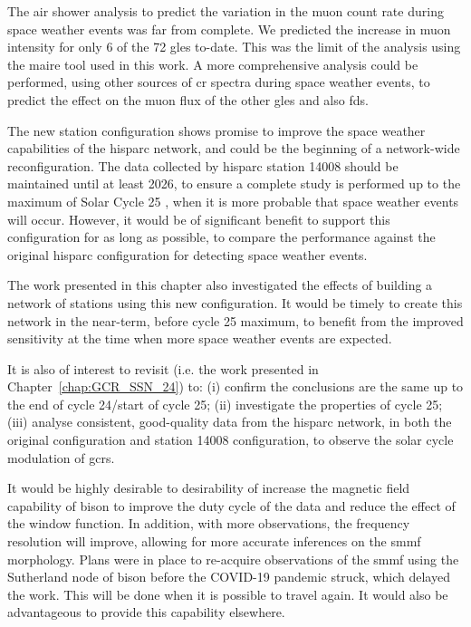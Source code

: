 The air shower analysis to predict the variation in the muon count rate during space weather events was far from complete. We predicted the increase in muon intensity for only 6 of the 72 \glspl{gle} to-date. This was the limit of the analysis using the \gls{maire} tool used in this work. A more comprehensive analysis could be performed, using other sources of \gls{cr} spectra during space weather events, to predict the effect on the muon flux of the other \glspl{gle} and also \glspl{fd}.

The new station configuration shows promise to improve the space weather capabilities of the \gls{hisparc} network, and could be the beginning of a network-wide reconfiguration. The data collected by \gls{hisparc} station 14008 should be maintained until at least 2026, to ensure a complete study is performed up to the maximum of Solar Cycle 25 \citep{mcintosh_overlapping_2020, pesnell_lessons_2020}, when it is more probable that space weather events will occur. However, it would be of significant benefit to support this configuration for as long as possible, to compare the performance against the original \gls{hisparc} configuration for detecting space weather events.

The work presented in this chapter also investigated the effects of building a network of stations using this new configuration. It would be timely to create this network in the near-term, before cycle 25 maximum, to benefit from the improved sensitivity at the time when more space weather events are expected.


\vspace{2em}


It is also of interest to revisit \citet{ross_behaviour_2019} (i.e. the work presented in Chapter~\ref{chap:GCR_SSN_24}) to: (i) confirm the conclusions are the same up to the end of cycle 24/start of cycle 25; (ii) investigate the properties of cycle 25; (iii) analyse consistent, good-quality data from the \gls{hisparc} network, in both the original configuration and station 14008 configuration, to observe the solar cycle modulation of \glspl{gcr}.


\vspace{2em}


It would be highly desirable to desirability of increase the magnetic field capability of \gls{bison} to improve the duty cycle of the data and reduce the effect of the window function. In addition, with more observations, the frequency resolution will improve, allowing for more accurate inferences on the \gls{smmf} morphology. Plans were in place to re-acquire observations of the \gls{smmf} using the Sutherland node of \gls{bison} before the COVID-19 pandemic struck, which delayed the work. This will be done when it is possible to travel again. It would also be advantageous to provide this capability elsewhere.

